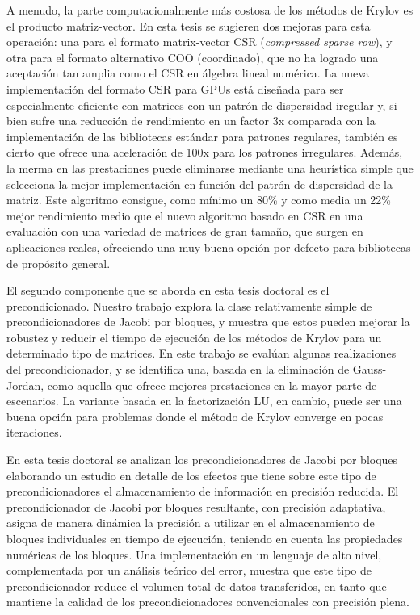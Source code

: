 A menudo, la parte computacionalmente más costosa de los métodos de Krylov es el
producto matriz-vector. En esta tesis se sugieren dos mejoras para esta
operación: una para el formato matrix-vector CSR (\textit{compressed sparse
row}), y otra para el formato alternativo COO (coordinado), que no ha logrado
una aceptación tan amplia como el CSR en álgebra lineal numérica.  La nueva
implementación del formato CSR para GPUs está diseñada para ser especialmente
eficiente con matrices con un patrón de dispersidad iregular y, si bien sufre
una reducción de rendimiento en un factor 3x comparada con la implementación de
las bibliotecas estándar para patrones regulares, también es cierto que ofrece
una aceleración de 100x para los patrones irregulares.  Además, la merma en las
prestaciones puede eliminarse mediante una heurística simple que selecciona la
mejor implementación en función del patrón de dispersidad de la matriz. Este
algoritmo consigue, como mínimo un 80\% y como media un 22\% mejor rendimiento
medio que el nuevo algoritmo basado en CSR en una evaluación con una variedad de
matrices de gran tamaño, que surgen en aplicaciones reales, ofreciendo una muy
buena opción por defecto para bibliotecas de propósito general.

El segundo componente que se aborda en esta tesis doctoral es el
precondicionado.  Nuestro trabajo explora la clase relativamente simple de
precondicionadores de Jacobi por bloques, y muestra que estos pueden mejorar la
robustez y reducir el tiempo de ejecución de los métodos de Krylov para un
determinado tipo de matrices.  En este trabajo se evalúan algunas realizaciones
del precondicionador, y se identifica una, basada en la eliminación de
Gauss-Jordan, como aquella que ofrece mejores prestaciones en la mayor parte de
escenarios. La variante basada en la factorización LU, en cambio, puede ser una
buena opción para problemas donde el método de Krylov converge en pocas
iteraciones.

En esta tesis doctoral se analizan los precondicionadores de Jacobi por bloques
elaborando un estudio en detalle de los efectos que tiene sobre este tipo de
precondicionadores el almacenamiento de información en precisión reducida.  El
precondicionador de Jacobi por bloques resultante, con precisión adaptativa,
asigna de manera dinámica la precisión a utilizar en el almacenamiento de
bloques individuales en tiempo de ejecución, teniendo en cuenta las propiedades
numéricas de los bloques. Una implementación en un lenguaje de alto nivel,
complementada por un análisis teórico del error, muestra que este tipo de
precondicionador reduce el volumen total de datos transferidos, en tanto que
mantiene la calidad de los precondicionadores convencionales con precisión
plena.


